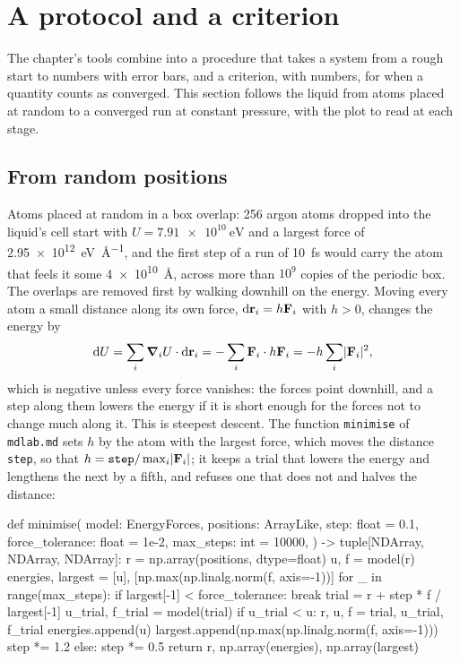\section{A protocol and a criterion}
\label{sec:cv-protocol}

The chapter's tools combine into a procedure that takes a system from a
rough start to numbers with error bars, and a criterion, with numbers,
for when a quantity counts as converged. This section follows the liquid
from atoms placed at random to a converged run at constant pressure, with
the plot to read at each stage.

\subsection*{From random positions}

Atoms placed at random in a box overlap: 256 argon atoms dropped into the
liquid's cell start with $U = \SI{7.91e10}{\electronvolt}$ and a largest
force of \SI{2.95e12}{\electronvolt\per\angstrom}, and the first step of a
run of \SI{10}{\femto\second} would carry the atom that feels it some
\SI{4e10}{\angstrom}, across more than $10^9$ copies of the periodic box. The overlaps are
removed first by walking downhill on the energy. Moving every atom a small
distance along its own force, $\mathrm{d}\bm{\mathrm{r}}_i = h\bm{\mathrm{F}}_i$ with $h > 0$, changes
the energy by
\begin{equation*}
   \mathrm{d} U = \sum_i\bm{\nabla}_iU\cdot\mathrm{d}\bm{\mathrm{r}}_i = -\sum_i\bm{\mathrm{F}}_i\cdot h\bm{\mathrm{F}}_i
   = -h\sum_i\lvert\bm{\mathrm{F}}_i\rvert^2 ,
\end{equation*}
which is negative unless every force vanishes: the forces point downhill,
and a step along them lowers the energy if it is short enough for the
forces not to change much along it. This is steepest descent. The function
\texttt{minimise} of \texttt{mdlab.md} sets $h$ by the atom with the
largest force, which moves the distance \texttt{step}, so that $h =
\texttt{step}/\max_i\lvert\bm{\mathrm{F}}_i\rvert$; it keeps a trial that lowers
the energy and lengthens the next by a fifth, and refuses one that does
not and halves the distance:

\begin{code}
def minimise(
    model: EnergyForces,
    positions: ArrayLike,
    step: float = 0.1,
    force_tolerance: float = 1e-2,
    max_steps: int = 10000,
) -> tuple[NDArray, NDArray, NDArray]:
    r = np.array(positions, dtype=float)
    u, f = model(r)
    energies, largest = [u], [np.max(np.linalg.norm(f, axis=-1))]
    for _ in range(max_steps):
        if largest[-1] < force_tolerance:
            break
        trial = r + step * f / largest[-1]
        u_trial, f_trial = model(trial)
        if u_trial < u:
            r, u, f = trial, u_trial, f_trial
            energies.append(u)
            largest.append(np.max(np.linalg.norm(f, axis=-1)))
            step *= 1.2
        else:
            step *= 0.5
    return r, np.array(energies), np.array(largest)
\end{code}


